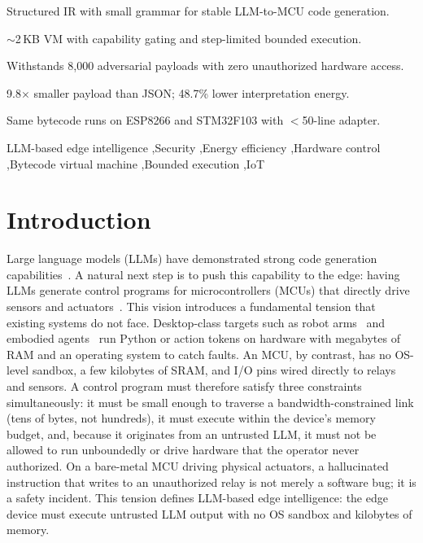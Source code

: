 \documentclass[a4paper,fleqn,longmktitle]{cas-dc}
\begin{document}
\begin{highlights}
\item Structured IR with small grammar for stable LLM-to-MCU code generation.
\item $\sim$2\,KB VM with capability gating and step-limited bounded execution.
\item Withstands 8{,}000 adversarial payloads with zero unauthorized hardware access.
\item 9.8$\times$ smaller payload than JSON; 48.7\% lower interpretation energy.
\item Same bytecode runs on ESP8266 and STM32F103 with $<$50-line adapter.
\end{highlights}

\begin{keywords}
LLM-based edge intelligence \sep Security \sep Energy efficiency \sep Hardware control \sep Bytecode virtual machine \sep Bounded execution \sep IoT
\end{keywords}

{\hfuzz=124pt \maketitle}

\section{Introduction}
\label{sec:intro}

Large language models (LLMs) have demonstrated strong code generation capabilities~\citep{chen2021codex,li2022alphacode,raffel2020t5}. A natural next step is to push this capability to the edge: having LLMs generate control programs for microcontrollers (MCUs) that directly drive sensors and actuators~\citep{liang2023code,brohan2023rt2}. This vision introduces a fundamental tension that existing systems do not face. Desktop-class targets such as robot arms~\citep{liang2023code} and embodied agents~\citep{brohan2023rt2} run Python or action tokens on hardware with megabytes of RAM and an operating system to catch faults. An MCU, by contrast, has no OS-level sandbox, a few kilobytes of SRAM, and I/O pins wired directly to relays and sensors. A control program must therefore satisfy three constraints simultaneously: it must be small enough to traverse a bandwidth-constrained link (tens of bytes, not hundreds), it must execute within the device's memory budget, and, because it originates from an untrusted LLM, it must not be allowed to run unboundedly or drive hardware that the operator never authorized. On a bare-metal MCU driving physical actuators, a hallucinated instruction that writes to an unauthorized relay is not merely a software bug; it is a safety incident. This tension defines LLM-based edge intelligence: the edge device must execute untrusted LLM output with no OS sandbox and kilobytes of memory.
\end{document}
